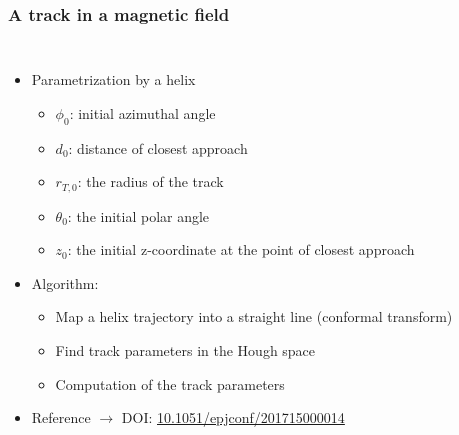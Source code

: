 \documentclass[aspectratio=169, hyperref={colorlinks=true,pdfpagelabels=false,linkcolor=black}, xcolor=dvipsnames,10pt]{beamer}
\begin{document}
\begin{frame}
  \frametitle{A track in a magnetic field}

\begin{columns}

  \begin{itemize}
    \item Parametrization by a helix
    \begin{itemize}
      \item $\phi_0$: initial azimuthal angle
      \item $d_0$: distance of closest approach
      \item $r_{T,0}$: the radius of the track
      \item $\theta_0$: the initial polar angle
      \item $z_0$: the initial z-coordinate at the point of closest approach
    \end{itemize}
    \item Algorithm:
    \begin{itemize}
      \item Map a helix trajectory into a straight line (conformal transform)
      \item Find track parameters in the Hough space
      \item Computation of the track parameters
    \end{itemize}
    \item Reference $\rightarrow$ DOI: \url{10.1051/epjconf/201715000014}
  \end{itemize}


\end{columns}
\end{frame}
\end{document}

